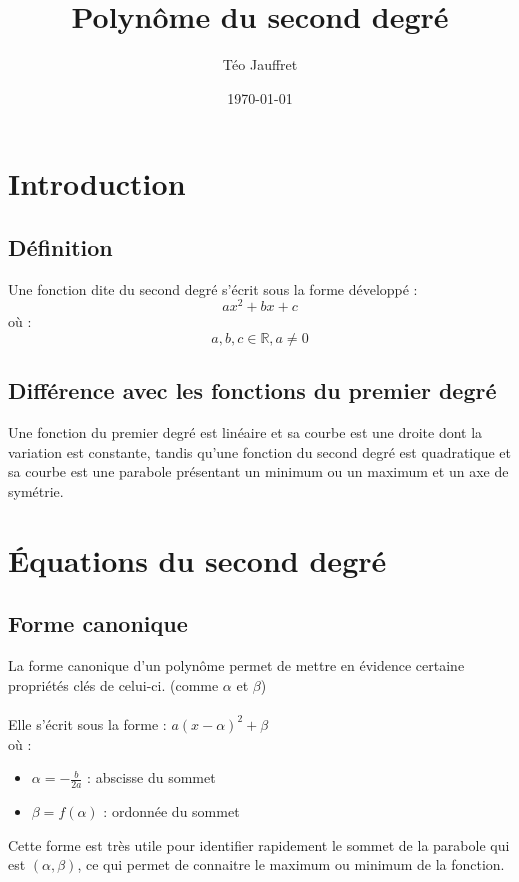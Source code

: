 \documentclass{article} %
\title{Polynôme du second degré}
\author{Téo Jauffret}
\date{\today}
\begin{document}
	\maketitle %
	\tableofcontents
	
	\newpage
	
	\section{Introduction}
	\subsection{Définition}
	Une fonction dite du second degré s'écrit sous la forme développé : 
	\[
	ax^2 + bx + c
	\]
	où : $$a, b, c \in \mathbb{R}, a \neq 0$$
	
	\subsection{Différence avec les fonctions du premier degré}
	Une fonction du premier degré est linéaire et sa courbe est une droite dont la variation est constante, tandis qu'une fonction du second degré est quadratique et sa courbe est une parabole présentant un minimum ou un maximum et un axe de symétrie.
	
	\section{Équations du second degré}
	\subsection{Forme canonique}
	La forme canonique d'un polynôme permet de mettre en évidence certaine propriétés clés de celui-ci. (comme $\alpha$ et $\beta$)\\\\
	Elle s'écrit sous la forme : $a(x - \alpha)^2 + \beta$\\
	où :
	\begin{itemize}
		\item $\alpha = -\frac{b}{2a}$ : abscisse du sommet
		\item $\beta = f(\alpha)$ : ordonnée du sommet\\
	\end{itemize}
	
	Cette forme est très utile pour identifier rapidement le sommet de la parabole qui est $(\alpha, \beta)$, ce qui permet de connaitre le maximum ou minimum de la fonction.\\
	
\end{document}
